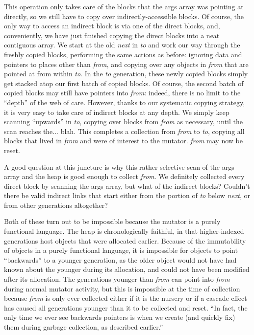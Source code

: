 This operation only takes care of the blocks that 
the args array was pointing at directly, so we still have to copy 
over indirectly-accessible blocks. Of course, the only way to 
access an indirect 
block is via one of the direct blocks, and, conveniently, we have
just finished copying the direct blocks into a neat contiguous
array. We start at the old \emph{next} in \emph{to}
and work our way through the freshly copied blocks, performing
the same actions as before: ignoring data and pointers to 
places other than \emph{from}, and copying over any objects in
\emph{from} that are pointed at from within \emph{to}. In
the \emph{to} generation, these newly copied blocks 
simply get stacked atop our first batch of copied blocks. 
Of course, the second batch of copied blocks may still
have pointers into \emph{from}: indeed, there is no limit to the 
``depth'' of the web of care. However, thanks to our systematic
copying strategy, it is very easy to take care of indirect
blocks at any depth. We simply keep scanning ``upwards'' in 
\emph{to}, copying over blocks from \emph{from} as necessary, 
until the scan reaches the... blah. 
This completes a collection 
from \emph{from} to \emph{to}, copying all blocks that lived
in \emph{from} and were of interest to the mutator. 
\emph{from} may now be reset.

A good question at this juncture is why this rather selective scan 
of the args array and the heap is good enough to collect \emph{from}. 
We definitely collected every direct block by scanning the args array,
but what of the indirect blocks? Couldn't there be valid indirect links
that start either from the portion of \emph{to} below \emph{next}, 
or from other generations altogether? 

Both of these turn out to be impossible because the 
{\color{magenta}mutator is a purely functional language.}
The heap is chronologically
faithful, in that higher-indexed generations host
objects that were allocated earlier. Because
of the immutability of objects in a purely functional language, 
it is impossible for objects to point ``backwards'' to 
a younger generation, as the older object would not have
had known about the younger during its allocation, and could not 
have been modified after its allocation. The generations 
younger than \emph{from} can point into \emph{from} during 
normal mutator activity, but this is
impossible at the time of collection 
because \emph{from} is only ever collected either if it is
the nursery or if a cascade effect has caused all generations younger
than it to be collected and reset. 
``In fact, the only time we ever see backwards pointers
is when we create (and quickly fix) them during garbage collection, 
as described earlier.''

